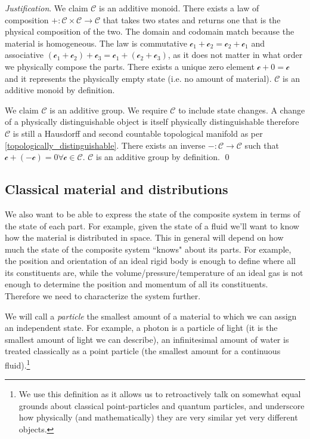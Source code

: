 \documentclass[aps,pra,10pt,twocolumn,floatfix,nofootinbib]{revtex4-1}
\numberwithin{equation}{section}
\theoremstyle{definition}
\newenvironment{justification}{\emph{Justification}.}{\qed}
\begin{document}
\begin{justification}
We claim $\mathcal{C}$ is an additive monoid. There exists a law of composition $+ : \mathcal{C} \times \mathcal{C} \rightarrow \mathcal{C}$ that takes two states and returns one that is the physical composition of the two. The domain and codomain match because the material is homogeneous. The law is commutative $\mathcal{c}_1 +\mathcal{c}_2 = \mathcal{c}_2+\mathcal{c}_1$ and associative $(\mathcal{c}_1 + \mathcal{c}_2) + \mathcal{c}_3 = \mathcal{c}_1 + (\mathcal{c}_2 + \mathcal{c}_3)$, as it does not matter in what order we physically compose the parts. There exists a unique zero element $\mathcal{c} + 0 = \mathcal{c}$ and it represents the physically empty state (i.e. no amount of material). $\mathcal{C}$ is an additive monoid by definition.

We claim $\mathcal{C}$ is an additive group. We require $\mathcal{C}$ to include state changes. A change of a physically distinguishable object is itself physically distinguishable therefore $\mathcal{C}$ is still a Hausdorff and second countable topological manifold as per \ref{topologically_distinguishable}. There exists an inverse $- : \mathcal{C} \rightarrow \mathcal{C}$ such that $\mathcal{c} + ( - \mathcal{c}) = 0 \forall \mathcal{c} \in \mathcal{C}$. $\mathcal{C}$ is an additive group by definition. 
\end{justification}

\subsection{Classical material and distributions}
We also want to be able to express the state of the composite system in terms of the state of each part. For example, given the state of a fluid we'll want to know how the material is distributed in space. This in general will depend on how much the state of the composite system ``knows" about its parts. For example, the position and orientation of an ideal rigid body is enough to define where all its constituents are, while the volume/pressure/temperature of an ideal gas is not enough to determine the position and momentum of all its constituents. Therefore we need to characterize the system further.

We will call a \emph{particle} the smallest amount of a material to which we can assign an independent state. For example, a photon is a particle of light (it is the smallest amount of light we can describe), an infinitesimal amount of water is treated classically as a point particle (the smallest amount for a continuous fluid).\footnote{We use this definition as it allows us to retroactively talk on somewhat equal grounds about classical point-particles and quantum particles, and underscore how physically (and mathematically) they are very similar yet very different objects.}
\end{document}
